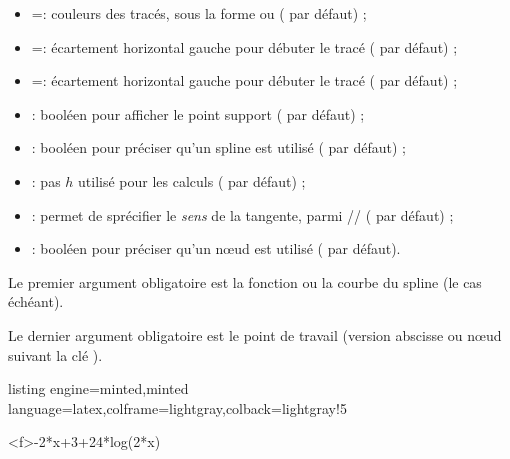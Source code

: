 \documentclass[11pt,a4paper]{ltxdoc}
\begin{document}
\begin{itemize}
	\item {} =: couleurs des tracés, sous la forme  ou  ( par défaut) ;
	\item {} =: écartement horizontal gauche pour débuter le tracé ( par défaut) ;
	\item {} =: écartement horizontal gauche pour débuter le tracé ( par défaut) ;
	\item {} : booléen pour afficher le point support ( par défaut) ;
	\item {} : booléen pour préciser qu'un spline est utilisé ( par défaut) ;
	\item {} : pas $h$ utilisé pour les calculs ( par défaut) ;
	\item {} : permet de sprécifier le \textit{sens} de la tangente, parmi // ( par défaut) ;
	\item {} : booléen pour préciser qu'un nœud est utilisé ( par défaut).
\end{itemize}

\smallskip

Le premier argument obligatoire est la fonction ou la courbe du spline (le cas échéant).

\smallskip

Le dernier argument obligatoire est le point de travail (version abscisse ou nœud suivant la clé ).

\begin{tcblisting}{listing engine=minted,minted language=latex,colframe=lightgray,colback=lightgray!5}
\begin{GraphiqueTikz}%
	[x=0.9cm,y=0.425cm,Xmin=4,Xmax=20,Origx=4,
	Ymin=40,Ymax=56,Ygrille=2,Ygrilles=1,Origy=40]
	{-2*x+3+24*log(2*x)}
\end{GraphiqueTikz}
\end{tcblisting}
\end{document}
